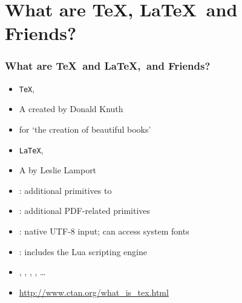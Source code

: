 \section[Introduction]{What are \TeX, \LaTeX\ and Friends?}
\begin{frame}
\frametitle{What are \TeX\ and \LaTeX,\ and Friends?}

\begin{description}
\item<1>[\TeX] 
\begin{itemize}
\item {} \texttt{TeX}, 
\item A  created by Donald Knuth
\item for `the creation of beautiful books'
\end{itemize}


\item<2>[\LaTeX]
\begin{itemize}
\item {} \texttt{LaTeX}, 
\item A  by Leslie Lamport
	\end{itemize}

\pause

\item<3-4>[Binaries]
	\begin{itemize}
  \item {}: additional primitives to 
	\item {}: additional PDF-related primitives
  \item \structure{\XeTeX}: native UTF-8 input; can access system fonts
	\item {}: includes the Lua scripting engine
\end{itemize}
\item <5>[Friends]
\begin{itemize}
\item \structure{\BibTeX}, \structure{\MakeIndex}, \structure{\METAFONT}, ,  \ldots
\item \url{http://www.ctan.org/what_is_tex.html}
\end{itemize}
\end{description}
\end{frame}

